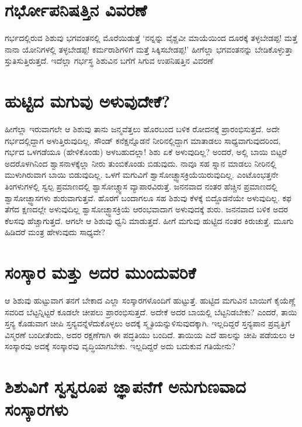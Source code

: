 \section*{ಗರ್ಭೋಪನಿಷತ್ತಿನ ವಿವರಣೆ}

ಗರ್ಭದಲ್ಲಿರುವ ಶಿಶುವು ಭಗವಂತನಲ್ಲಿ ಮೊರೆಯಿಡುತ್ತೆ `ನನ್ನನ್ನು ವೈಶ್ಣವೀ ಮಾಯೆಯಿಂದ ದೂರಕ್ಕೆ ತಳ್ಳಬೇಡಪ್ಪ! ಮತ್ತೆ ನಾನಾ ಯೋನಿಗಳಲ್ಲಿ ತಳ್ಳಬೇಡಪ್ಪ! ಕರ್ಮರಾಶಿಗಳಿಗೆ ಮತ್ತೆ ಸಿಕ್ಕಿಸಬೇಡಪ್ಪ!' ಹೀಗೆಲ್ಲಾ ಭಗವಂತನನ್ನು ಬೇಡಿಕೊಳ್ಳುತ್ತಾ ಸ್ತುತಿಸುತ್ತಿರುತ್ತದೆ. ಇದೆಲ್ಲಾ ಗರ್ಭಸ್ಥ ಶಿಶುವಿನ ಬಗೆಗೆ ಸಿಗುವ ಉಪನಿಷತ್ತಿನ ವಿವರಣೆ

\section*{ಹುಟ್ಟಿದ ಮಗುವು ಅಳುವುದೇಕೆ?}

ಹೀಗೆಲ್ಲಾ ಇರುವಾಗಲೇ ಆ ಶಿಶುವು ತಾನು ಜನ್ಮವೆತ್ತಲು ಹೊರಬಂದ ಬಳಿಕ ರೋದನಕ್ಕೆ ಪ್ರಾರಂಭಿಸುತ್ತದೆ. ಅದೇ ಗರ್ಭದಲ್ಲಿದ್ದಾಗ ಅಳುತ್ತಿರುವುದಿಲ್ಲ. ಸೌಂಡ್ ಕನೆಕ್ಷನ್ನೊಡನೆ ನೀರಿನಲ್ಲಿದ್ದಾಗ ಮಾತಾಡಲು ಸಾಧ್ಯವಾಗುವುದರಿಂದ, ಗರ್ಭದ ಒಳಗಡೆಯೂ (ಹೇಳಿಕೊಂಡು) ಅಳಬಹುದಲ್ಲಾ! ಶಿಶು ಏಕೆ ಅಳುವುದಿಲ್ಲ? ಅಂದರೆ, ಅಲ್ಲಿ ಬಾಯಿ ಬಿಟ್ಟರೆ ಅದರೊಳಗಿನಿಂದ ಶ್ವಾಸನಾಳಕ್ಕೆಲ್ಲಾ ನೀರು ತುಂಬಿಕೊಂಡು ಬಿಡುವುದು. ನಾವೂ ಸಹ ಸ್ನಾನ ಮಾಡಲು ನೀರಿನಲ್ಲಿ ಮುಳುಗಿರುವಾಗ ಬಾಯಿ ಬಿಡುವುದಿಲ್ಲ. ಒಳಗೆ ಮಗುವಿಗೆ ಶ್ವಾಸೋಚ್ಛ್ವಾಸಕ್ರಿಯೆಯಿರುವುದಿಲ್ಲ. ಎಂಟೊಂಭತ್ತನೇ ತಿಂಗಳುಗಳಲ್ಲಿ ಸ್ವಲ್ಪ ಪ್ರಮಾಣದಲ್ಲಿ ಶ್ವಾಸೋಚ್ಚ್ವಾಸ ವ್ಯಾಪಾರವಿರುತ್ತೆ. ಜನನವಾದ ನಂತರ ಹೆಚ್ಚಿನ ಪ್ರಮಾಣದಲ್ಲಿ ಶ್ವಾಸೋಚ್ಛ್ವಾಸಗಳು ಶುರುವಾಗುತ್ತವೆ. ಹೊರಗೆ ಬಂದಾಗಲೂ ಸಹ ಶಿಶುವು ಕೆಳಕ್ಕೆ ಬಿದ್ದೊಡನೆಯೇ ಅಳುವುದಿಲ್ಲ. ಕಫ ತೆಗೆದ ಕ್ಷಣದಲ್ಲೇ ಅಳುವುದಿಲ್ಲ ಶ್ವಾಸೋಚ್ಛ್ವಾಸಕ್ರಿಯೆ ಆರಂಭವಾದಾಗ ಅಳುವುದಕ್ಕೆ ಶುರು. ಜನನವಾದ ಬಳಿಕ ಅದರ ಕೆಲಸವು ಹೆಚ್ಚಾಗುತ್ತದೆ. ಆಗಲೇ ಆ ಶಿಶುವು ಧ್ವನಿ ಮಾಡುತ್ತದೆ. ಹೀಗೆ ಮಗುವು ಹುಟ್ಟಿದ ನಂತರ ಕಿರುಚುತ್ತೆ. ಮೂಗು ಹಿಡಿದರೆ ಮಂತ್ರ ಹೇಳುವುದು ಸಾಧ್ಯವೇ?

\section*{ಸಂಸ್ಕಾರ ಮತ್ತು ಅದರ ಮುಂದುವರಿಕೆ}

ಆ ಶಿಶುವು ಹುಟ್ಟುವಾಗ ತನಗೆ ಬೇಕಾದ ಎಲ್ಲಾ ಸಂಸ್ಕಾರಗಳೊಂದಿಗೆ ಹುಟ್ಟುತ್ತೆ. ಹುಟ್ಟಿದ ಮಗುವಿನ ಬಾಯಿಗೆ ಕೈಯೆಣ್ಣೆ ಸವರಿದ ಬೆಟ್ಟನ್ನಿಟ್ಟರೆ ಕೂಡಲೇ ಚೀಪಲು ಪ್ರಾರಂಭಿಸುತ್ತದೆ. ಅದೇಕೆ ಅದರ ಬಾಯಲ್ಲಿ ಬೆಟ್ಟನಿಡಬೇಕು? ಎಂದರೆ, ತಾಯಿ ಸ್ತನ್ಯ ಕೊಡುವಾಗ ಚೀಪಿ ಸ್ತನ್ಯವನ್ನೆಳೆದುಕೊಳ್ಳಲು ಅದಕ್ಕೆ ಸ್ಮೃತಿಯನ್ನುಳಿಸುವುದಕ್ಕಾಗಿ. ಇಲ್ಲದಿದ್ದರೆ ಸ್ತನ್ಯಪಾನ ಪ್ರವೃತ್ತಿಗೆ ವಿಸ್ಮರಣೆ ಬಂದೀತೆಂದು, ಅದರ ರಕ್ಷಣೆಗಾಗಿ ಈ ಪದ್ಧತಿಯು ಬಂದಿದೆ. ತಾಯಿಯ ಎದೆ ಹಾಲನ್ನು ಚೀಪಿ ಪಡೆಯಲು ಆ ಸಂಸ್ಕಾರವು ಅದಕ್ಕೆ ಸಂಸ್ಕಾರವು ವೃದ್ಧಿಯಾಗಬೇಕು. ಇಲ್ಲದಿದ್ದರೆ ಅದು ಬದುಕುವ ಗತಿಯೇನು?

\section*{ಶಿಶುವಿಗೆ ಸ್ವಸ್ವರೂಪ ಜ್ಞಾಪನೆಗೆ ಅನುಗುಣವಾದ ಸಂಸ್ಕಾರಗಳು}

